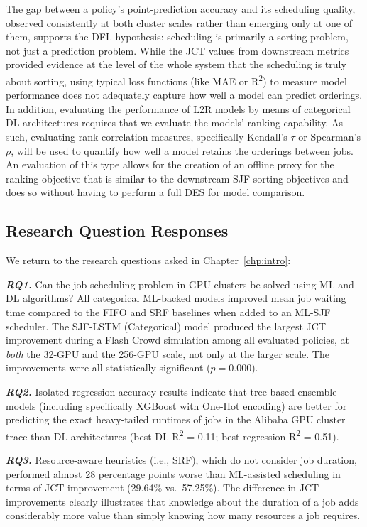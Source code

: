The gap between a policy's point-prediction accuracy and its scheduling quality, observed consistently at both cluster scales rather than emerging only at one of them, supports the DFL hypothesis: scheduling is primarily a sorting problem, not just a prediction problem. While the JCT values from downstream metrics provided evidence at the level of the whole system that the scheduling is truly about sorting, using typical loss functions (like MAE or R\textsuperscript{2}) to measure model performance does not adequately capture how well a model can predict orderings. In addition, evaluating the performance of L2R models by means of categorical DL architectures requires that we evaluate the models' ranking capability. As such, evaluating rank correlation measures, specifically Kendall's $\tau$ or Spearman's $\rho$, will be used to quantify how well a model retains the orderings between jobs. An evaluation of this type allows for the creation of an offline proxy for the ranking objective that is similar to the downstream SJF sorting objectives and does so without having to perform a full DES for model comparison.

\clearpage
\subsection{Research Question Responses}

We return to the research questions asked in Chapter~\ref{chp:intro}:

\textbf{\textit{RQ1.}} Can the job-scheduling problem in GPU clusters be solved using ML and DL algorithms? All categorical ML-backed models improved mean job waiting time compared to the FIFO and SRF baselines when added to an ML-SJF scheduler. The SJF-LSTM (Categorical) model produced the largest JCT improvement during a Flash Crowd simulation among all evaluated policies, at \emph{both} the 32-GPU and the 256-GPU scale, not only at the larger scale. The improvements were all statistically significant ($p = 0.000$).

\textbf{\textit{RQ2.}} Isolated regression accuracy results indicate that tree-based ensemble models (including specifically XGBoost with One-Hot encoding) are better for predicting the exact heavy-tailed runtimes of jobs in the Alibaba GPU cluster trace than DL architectures (best DL R\textsuperscript{2} = 0.11; best regression R\textsuperscript{2} = 0.51).

\textbf{\textit{RQ3.}} Resource-aware heuristics (i.e., SRF), which do not consider job duration, performed almost 28 percentage points worse than ML-assisted scheduling in terms of JCT improvement (29.64\% vs.\ 57.25\%). The difference in JCT improvements clearly illustrates that knowledge about the duration of a job adds considerably more value than simply knowing how many resources a job requires.

